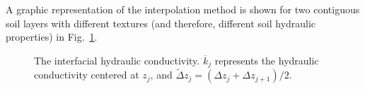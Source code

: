 %
%
%
%
%
%
%
%
%

A graphic representation of the interpolation method is
shown for two contiguous soil layers with different
textures (and therefore, different soil hydraulic 
properties) in Fig.~\ref{kint}. 

\begin{figure}[h]
		 \begin{center}
		 \caption{The interfacial hydraulic
                   conductivity. ${\overline k}_j$
represents the hydraulic conductivity centered at $z_j$, and
${\tilde\Delta} z_j = 
\left(\Delta z_{j} + \Delta z_{j+1}\right)/2$.}
		 \label{kint}
		 \end{center}
\end{figure}

